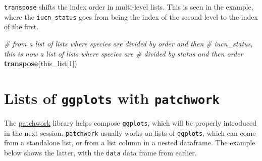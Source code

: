 \documentclass[]{book}
\newenvironment{Shaded}{}{}
\newcommand{\CommentTok}[1]{\textcolor[rgb]{0.38,0.63,0.69}{\textit{#1}}}
\newcommand{\ControlFlowTok}[1]{\textcolor[rgb]{0.00,0.44,0.13}{\textbf{#1}}}
\newcommand{\DecValTok}[1]{\textcolor[rgb]{0.25,0.63,0.44}{#1}}
\newcommand{\KeywordTok}[1]{\textcolor[rgb]{0.00,0.44,0.13}{\textbf{#1}}}
\newcommand{\NormalTok}[1]{#1}
\newcommand{\OperatorTok}[1]{\textcolor[rgb]{0.40,0.40,0.40}{#1}}
\newcommand{\StringTok}[1]{\textcolor[rgb]{0.25,0.44,0.63}{#1}}
\begin{document}
\texttt{transpose} shifts the index order in multi-level lists. This is seen in the example, where the \texttt{iucn\_status} goes from being the index of the second level to the index of the first.

\begin{Shaded}
\end{Shaded}

\begin{Shaded}
\begin{Highlighting}[]
\CommentTok{# from a list of lists where species are divided by order and then}
\CommentTok{# iucn_status, this is now a list of lists where species are}
\CommentTok{# divided by status and then order}
\KeywordTok{transpose}\NormalTok{(this_list[}\DecValTok{1}\NormalTok{])}
\end{Highlighting}
\end{Shaded}

\hypertarget{lists-of-ggplots-with-patchwork}{%
\section{\texorpdfstring{Lists of \texttt{ggplots} with \texttt{patchwork}}{Lists of ggplots with patchwork}}\label{lists-of-ggplots-with-patchwork}}

The \href{https://patchwork.data-imaginist.com/}{patchwork} library helps compose \texttt{ggplots}, which will be properly introduced in the next session. \texttt{patchwork} usually works on lists of \texttt{ggplots}, which can come from a standalone list, or from a list column in a nested dataframe.
The example below shows the latter, with the \texttt{data} data frame from earlier.

\begin{Shaded}
\end{Shaded}
\end{document}
